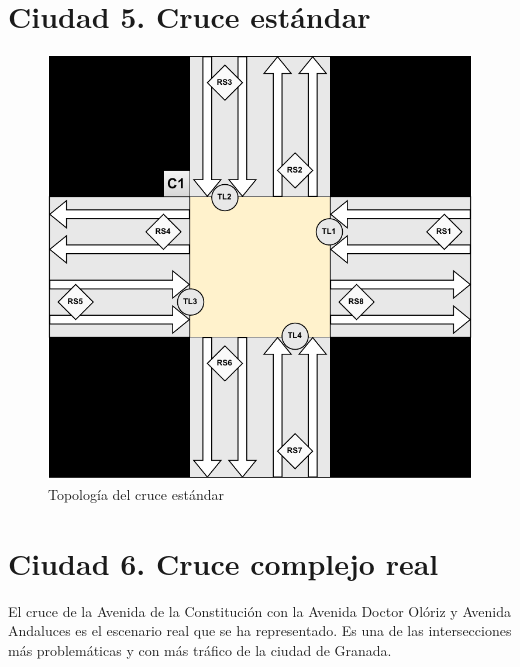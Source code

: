 \section{Ciudad 5. Cruce estándar}
\begin{figure}[H]
    \centering
    \includegraphics[width=1\linewidth]{text/image/DCruc-CEstandar-Topologia.pdf}
    \caption{Topología del cruce estándar}
    \label{fig:cruce_estandar_topologia_esc}
\end{figure}

\newpage
\section{Ciudad 6. Cruce complejo real}
    \label{section:cruce_real}
El cruce de la Avenida de la Constitución con la Avenida Doctor Olóriz y Avenida Andaluces es el escenario real que se ha representado. Es una de las intersecciones más problemáticas y con más tráfico de la ciudad de Granada.
